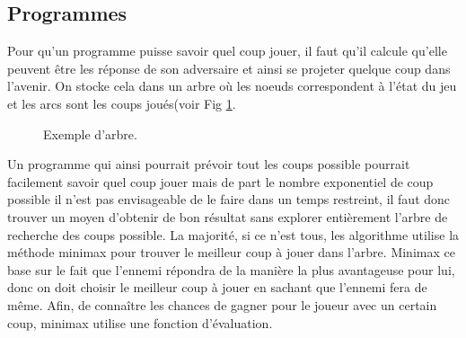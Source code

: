 \documentclass[10pt,a4paper]{article}
\begin{document}
\subsection{Programmes}
Pour qu'un programme puisse savoir quel coup jouer, il faut qu'il calcule qu'elle peuvent être les réponse de son adversaire et ainsi se projeter quelque coup dans l'avenir. On stocke cela dans un arbre où les noeuds correspondent à l'état du jeu et les arcs sont les coups joués(voir Fig \ref{fig:exemple_arbre}.
  \begin{figure}[H]    
    \centering
     \caption {Exemple d'arbre.\label{fig:exemple_arbre} }
 \end{figure}
  Un programme qui ainsi pourrait prévoir tout les coups possible pourrait facilement savoir quel coup jouer mais de part le nombre exponentiel de coup possible il n'est pas envisageable de le faire dans un temps restreint, il faut donc trouver un moyen d'obtenir de bon résultat sans explorer entièrement l'arbre de recherche des coups possible.\newline
  La majorité, si ce n'est tous, les algorithme utilise la méthode minimax pour trouver le meilleur coup à jouer dans l'arbre. Minimax ce base sur le fait que l'ennemi répondra de la manière la plus avantageuse pour lui, donc on doit choisir le meilleur coup à jouer en sachant que l'ennemi fera de même. Afin, de connaître les chances de gagner pour le joueur avec un certain coup, minimax utilise une fonction d'évaluation.
\end{document}
